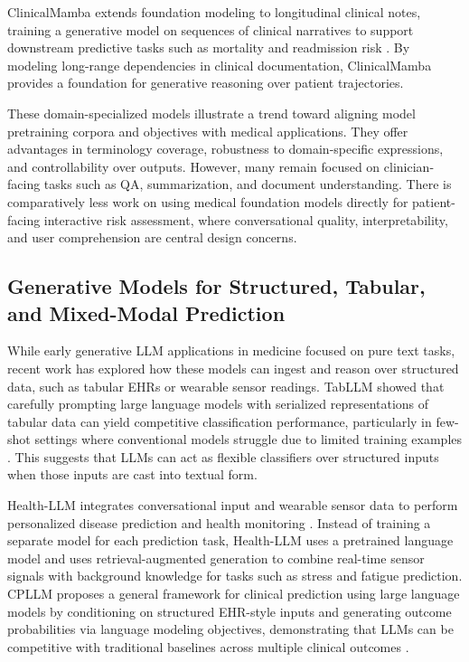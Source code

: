 ClinicalMamba extends foundation modeling to longitudinal clinical notes, training a generative model on sequences of clinical narratives to support downstream predictive tasks such as mortality and readmission risk \cite{yang2024clinicalmamba}. By modeling long-range dependencies in clinical documentation, ClinicalMamba provides a foundation for generative reasoning over patient trajectories.

These domain-specialized models illustrate a trend toward aligning model pretraining corpora and objectives with medical applications. They offer advantages in terminology coverage, robustness to domain-specific expressions, and controllability over outputs. However, many remain focused on clinician-facing tasks such as QA, summarization, and document understanding. There is comparatively less work on using medical foundation models directly for patient-facing interactive risk assessment, where conversational quality, interpretability, and user comprehension are central design concerns.

\subsection{Generative Models for Structured, Tabular, and Mixed-Modal Prediction}

While early generative LLM applications in medicine focused on pure text tasks, recent work has explored how these models can ingest and reason over structured data, such as tabular EHRs or wearable sensor readings. TabLLM showed that carefully prompting large language models with serialized representations of tabular data can yield competitive classification performance, particularly in few-shot settings where conventional models struggle due to limited training examples \cite{hegselmann2022tabllm}. This suggests that LLMs can act as flexible classifiers over structured inputs when those inputs are cast into textual form.

Health-LLM integrates conversational input and wearable sensor data to perform personalized disease prediction and health monitoring \cite{kim2024health}. Instead of training a separate model for each prediction task, Health-LLM uses a pretrained language model and uses retrieval-augmented generation to combine real-time sensor signals with background knowledge for tasks such as stress and fatigue prediction. CPLLM proposes a general framework for clinical prediction using large language models by conditioning on structured EHR-style inputs and generating outcome probabilities via language modeling objectives, demonstrating that LLMs can be competitive with traditional baselines across multiple clinical outcomes \cite{benshoham2024cpllm}.

